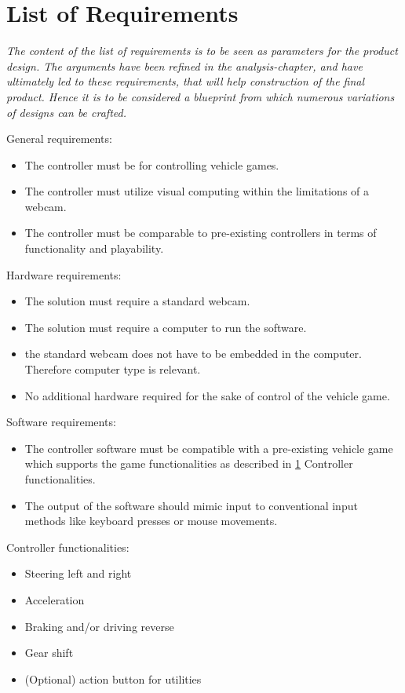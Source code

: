 \section{List of Requirements}
\label{LOR}

\textit{The content of the list of requirements is to be seen as parameters for the product design. The arguments have been refined in the analysis-chapter, and have ultimately led to these requirements, that will help construction of the final product. Hence it is to be considered a blueprint from which numerous variations of designs can be crafted.}
\bigskip

General requirements:
\begin{itemize}
\item The controller must be for controlling vehicle games.
\item The controller must utilize visual computing within the limitations of a webcam.
\item The controller must be comparable to pre-existing controllers in terms of functionality and playability.
\end{itemize}
Hardware requirements:
\begin{itemize}
\item The solution must require a standard webcam.
\item The solution must require a computer to run the software.
\item the standard webcam does not have to be embedded in the computer. Therefore computer type is relevant.
\item No additional hardware required for the sake of control of the vehicle game.
\end{itemize}
Software requirements:
\begin{itemize}
\item The controller software must be compatible with a pre-existing vehicle game which supports the game functionalities as described in \ref{LOR} Controller functionalities. 
\item The output of the software should mimic input to conventional input methods like keyboard presses or mouse movements.
\end{itemize}
Controller functionalities:
\begin{itemize}
\item Steering left and right
\item Acceleration
\item Braking and/or driving reverse
\item Gear shift
\item (Optional) action button for utilities 
\end{itemize}